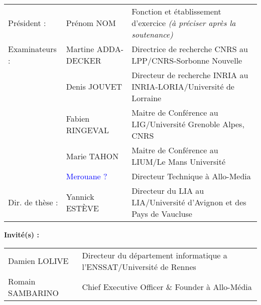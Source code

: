 {\begin{tabular}{@{}lll}
Pr\'{e}sident :        & Pr\'{e}nom NOM & Fonction et \'{e}tablissement d'exercice \textit{(à préciser après la soutenance)} \\
 Examinateurs :          & Martine ADDA-DECKER &Directrice de recherche CNRS au LPP/CNRS-Sorbonne Nouvelle \\
                         & Denis JOUVET &Directeur de recherche INRIA au INRIA-LORIA/Université de Lorraine \\
                         & Fabien RINGEVAL &Maitre de Conférence au LIG/Université Grenoble Alpes, CNRS \\
                         & Marie TAHON &Maitre de Conférence au LIUM/Le Mans Université \\
                         & \textcolor{blue}{Merouane ?} &Directeur Technique à Allo-Media \\
Dir. de th\`{e}se :    & Yannick ESTÈVE &Directeur du LIA au LIA/Université d'Avignon et des Pays de Vaucluse \\
\end{tabular}

\vspace{\baselineskip}
{\normalTwelve \textbf{Invit\'{e}(s) :}}\\ \newline
\footnotesizeTwelve
\begin{tabular}{@{}ll}
  Damien LOLIVE &Directeur du département informatique a l'ENSSAT/Université de Rennes \\
  Romain SAMBARINO &Chief Executive Officer \& Founder à Allo-Média \\
\end{tabular}
}


\maketitle
